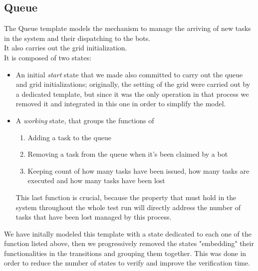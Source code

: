 \documentclass[10pt,a4paper]{article}
\begin{document}
		\subsection{Queue}
			The Queue template models the mechanism to manage the arriving of new tasks in the system and their dispatching to the bots.\\
			It also carries out the grid initialization.\\
			It is composed of two states:
			\begin{itemize}
				\item An initial \emph{start} state that we made also committed to carry out the queue and grid initializations; originally, the setting of the grid were carried out by a dedicated template, but since it was the only operation in that process we removed it and integrated in this one in order to simplify the model.
				\item A \emph{working} state, that groups the functions of
					\begin{enumerate}
						\item Adding a task to the queue
						\item Removing a task from the queue when it's been claimed by a bot
						\item Keeping count of how many tasks have been issued, how many tasks are executed and how many tasks have been lost
					\end{enumerate}
					This last function is crucial, because the property that must hold in the system throughout the whole test run will directly address the number of tasks that have been lost managed by this process.
			\end{itemize}
			We have initally modeled this template with a state dedicated to each one of the function listed above, then we progressively removed the states "embedding" their functionalities in the transitions and grouping them together. This was done in order to reduce the number of states to verify and improve the verification time. 
		
\end{document}
